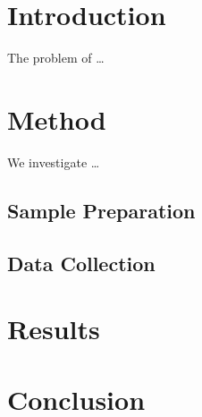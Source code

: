 \documentclass{article}
\begin{document}
\section{Introduction}

The problem of \ldots

\section{Method}

We investigate \ldots

\subsection{Sample Preparation}

\subsection{Data Collection}

\section{Results}

\section{Conclusion}
\end{document}
